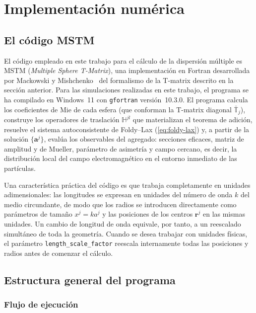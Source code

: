 \section{Implementación numérica}
\label{sec:mstm}

\subsection{El código MSTM}

El código empleado en este trabajo para el cálculo de la dispersión múltiple
es MSTM (\textit{Multiple Sphere
T-Matrix}), una implementación en Fortran desarrollada por
Mackowski y Mishchenko~\cite{Mackowski_code} del formalismo de la T-matrix descrito en
la sección anterior. Para las simulaciones realizadas en este trabajo,
el programa se ha compilado en Windows~11 con \texttt{gfortran}
versión~10.3.0. El programa calcula los coeficientes de Mie de cada
esfera (que conforman la T-matrix diagonal $\bar{\mathbb{T}}_j$),
construye los operadores de traslación $\mathbb{H}^{jl}$ que materializan
el teorema de adición, resuelve el sistema autoconsistente de Foldy--Lax
(\ref{eq:foldy-lax}) y, a partir de la solución
$\{\mathbf{a}^{j}\}$, evalúa los observables del agregado: secciones
eficaces, matriz de amplitud y de Mueller, parámetro de asimetría y
campo cercano, es decir, la distribución local del campo electromagnético
en el entorno inmediato de las partículas.

Una característica práctica del código es que trabaja completamente en
unidades adimensionales: las longitudes se expresan en unidades del
número de onda $k$ del medio circundante, de modo que los
radios se introducen directamente como parámetros de tamaño $x^j = k a^j$
y las posiciones de los centros $\mathbf{r}^j$ en las mismas unidades.
Un cambio de longitud de onda equivale, por tanto, a un reescalado
simultáneo de toda la geometría. Cuando se desea trabajar con unidades
físicas, el parámetro \texttt{length\_scale\_factor} reescala
internamente todas las posiciones y radios antes de comenzar el cálculo.



\subsection{Estructura general del programa}

\subsubsection{Flujo de ejecución}


